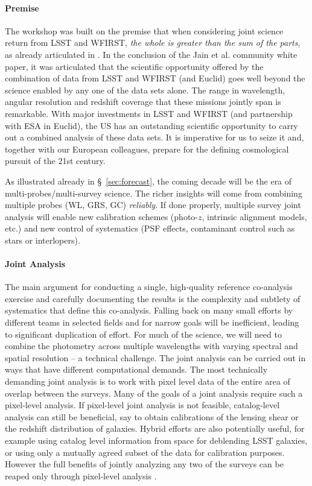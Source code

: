 \paragraph*{Premise} The workshop was built on the premise that when considering
joint science return from LSST and WFIRST, \emph{the whole is greater than the
sum of the parts}, as already articulated in \citet{Jain:2015cpa}. In the
conclusion of the Jain et al. community white paper, it was articulated that the
scientific opportunity offered by the combination of data from LSST and WFIRST
(and Euclid) goes well beyond the science enabled by any one of the data sets
alone. The range in wavelength, angular resolution and redshift coverage that
these missions jointly span is remarkable. With major investments in LSST and
WFIRST (and partnership with ESA in Euclid), the US has an outstanding
scientific opportunity to carry out a combined analysis of these data sets. It
is imperative for us to seize it and, together with our European colleagues,
prepare for the defining cosmological pursuit of the 21st century.

As illustrated already in \S~\ref{sec:forecast}, the coming decade will be the
era of multi-probes/multi-survey science. The richer insights will come from
combining multiple probes (WL, GRS, GC) \emph{reliably}. If done properly,
multiple survey joint analysis will enable new calibration schemes (photo-$z$,
intrinsic alignment models, etc.) and new control of systematics (PSF effects,
contaminant control such as stars or interlopers).

\paragraph*{Joint Analysis} The main argument for conducting a single,
high-quality reference co-analysis exercise and carefully documenting the
results is the complexity and subtlety of systematics that define this
co-analysis. Falling back on many small efforts by different teams in selected
fields and for narrow goals will be inefficient, leading to significant
duplication of effort.  For much of the science, we will need to combine the
photometry across multiple wavelengths with varying spectral and spatial
resolution – a technical challenge. The joint analysis can be carried out in
ways that have different computational demands. The most technically demanding
joint analysis is to work with pixel level data of the entire area of overlap
between the surveys. Many of the goals of a joint analysis require such a
pixel-level analysis. If pixel-level joint analysis is not feasible,
catalog-level analysis can still be beneficial, say to obtain calibrations of
the lensing shear or the redshift distribution of galaxies. Hybrid efforts are
also potentially useful, for example using catalog level information from space
for deblending LSST galaxies, or using only a mutually agreed subset of the data
for calibration purposes. However the full benefits of jointly analyzing any two
of the surveys can be reaped only through pixel-level analysis \citep{Jain:2015cpa}.

